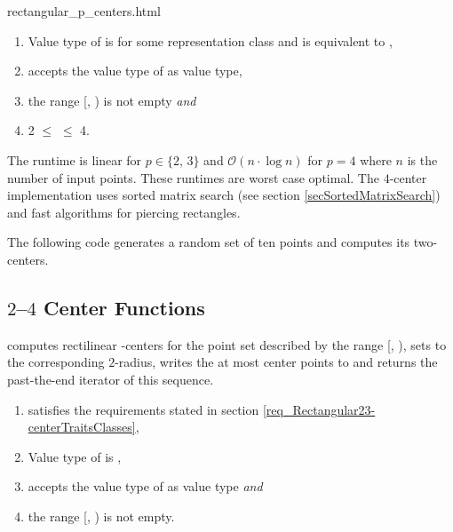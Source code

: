 \begin{ccHtmlClassFile}{rectangular_p_centers.html}
  \begin{enumerate}
  \item Value type of  is  for some
    representation class  and  is equivalent to ,
  \item {} accepts the value type of
     as value type,
  \item the range [, ) is not empty \textit{and}
  \item 2 $\le$  $\le$ 4.
  \end{enumerate}
  
  \ccImplementation The runtime is linear for $p \in \{2,\,3\}$ and
  $\mathcal{O}(n \cdot \log n)$ for $p = 4$ where $n$ is the number of input
  points. These runtimes are worst case optimal. The $4$-center implementation
  uses sorted matrix search (see section \ref{secSortedMatrixSearch}) and fast
  algorithms for piercing rectangles\cite{sw-rpppp-96}. 
  
  \ccExample The following code generates a random set of ten points
  and computes its two-centers.


  \begin{ccAdvanced}
    \subsection{$2$--$4$ Center Functions}
    

    \def\ccLongParamLayout{\ccTrue} 

    
    computes rectilinear -centers for the point set described by the
    range [, ), sets  to the corresponding $2$-radius,
    writes the at most  center points to  and returns the
    past-the-end iterator of this sequence.

    \begin{enumerate}
    \item {} satisfies the requirements stated in section
      \ref{req_Rectangular23-centerTraitsClasses},
    \item Value type of  is ,
    \item {} accepts the value type of 
      as value type \textit{and}
    \item the range [, ) is not empty.
    \end{enumerate}
    

\end{ccAdvanced}
\end{ccHtmlClassFile}
